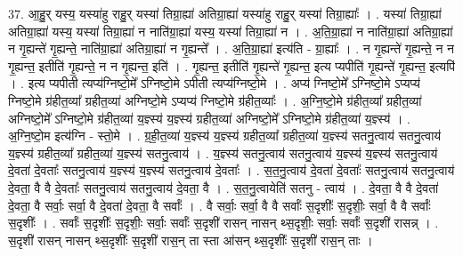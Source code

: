 \documentclass[17pt]{extarticle}
\begin{document}
37. आ॒हु॒र् यस्य॒ यस्या॑हु राहु॒र् यस्या॑ तिग्रा॒ह्या॑ अतिग्रा॒ह्या॑ यस्या॑हु राहु॒र् यस्या॑ तिग्रा॒ह्याः᳚ । . यस्या॑ तिग्रा॒ह्या॑ अतिग्रा॒ह्या॑ यस्य॒ यस्या॑ तिग्रा॒ह्या॑ न नाति॑ग्रा॒ह्या॑ यस्य॒ यस्या॑ तिग्रा॒ह्या॑ न । . अ॒ति॒ग्रा॒ह्या॑ न नाति॑ग्रा॒ह्या॑ अतिग्रा॒ह्या॑ न गृ॒ह्यन्ते॑ गृ॒ह्यन्ते॒ नाति॑ग्रा॒ह्या॑ अतिग्रा॒ह्या॑ न गृ॒ह्यन्ते᳚ । . अ॒ति॒ग्रा॒ह्या॑ इत्य॑ति - ग्रा॒ह्याः᳚ । . न गृ॒ह्यन्ते॑ गृ॒ह्यन्ते॒ न न गृ॒ह्यन्त॒ इतीति॑ गृ॒ह्यन्ते॒ न न गृ॒ह्यन्त॒ इति॑ । . गृ॒ह्यन्त॒ इतीति॑ गृ॒ह्यन्ते॑ गृ॒ह्यन्त॒ इत्य प्यपीति॑ गृ॒ह्यन्ते॑ गृ॒ह्यन्त॒ इत्यपि॑ । . इत्य प्यपीती त्यप्य॑ग्निष्टो॒मे᳚ ऽग्निष्टो॒मे ऽपीती त्यप्य॑ग्निष्टो॒मे । . अप्य॑ ग्निष्टो॒मे᳚ ऽग्निष्टो॒मे ऽप्यप्य॑ ग्निष्टो॒मे ग्र॑हीत॒व्या᳚ ग्रहीत॒व्या॑ अग्निष्टो॒मे ऽप्यप्य॑ ग्निष्टो॒मे ग्र॑हीत॒व्याः᳚ । . अ॒ग्नि॒ष्टो॒मे ग्र॑हीत॒व्या᳚ ग्रहीत॒व्या॑ अग्निष्टो॒मे᳚ ऽग्निष्टो॒मे ग्र॑हीत॒व्या॑ य॒ज्ञ्स्य॑ य॒ज्ञ्स्य॑ ग्रहीत॒व्या॑ अग्निष्टो॒मे᳚ ऽग्निष्टो॒मे ग्र॑हीत॒व्या॑ य॒ज्ञ्स्य॑ । . अ॒ग्नि॒ष्टो॒म इत्य॑ग्नि - स्तो॒मे । . ग्र॒ही॒त॒व्या॑ य॒ज्ञ्स्य॑ य॒ज्ञ्स्य॑ ग्रहीत॒व्या᳚ ग्रहीत॒व्या॑ य॒ज्ञ्स्य॑ सतनु॒त्वाय॑ सतनु॒त्वाय॑ य॒ज्ञ्स्य॑ ग्रहीत॒व्या᳚ ग्रहीत॒व्या॑ य॒ज्ञ्स्य॑ सतनु॒त्वाय॑ । . य॒ज्ञ्स्य॑ सतनु॒त्वाय॑ सतनु॒त्वाय॑ य॒ज्ञ्स्य॑ य॒ज्ञ्स्य॑ सतनु॒त्वाय॑ दे॒वता॑ दे॒वताः᳚ सतनु॒त्वाय॑ य॒ज्ञ्स्य॑ य॒ज्ञ्स्य॑ सतनु॒त्वाय॑ दे॒वताः᳚ । . स॒त॒नु॒त्वाय॑ दे॒वता॑ दे॒वताः᳚ सतनु॒त्वाय॑ सतनु॒त्वाय॑ दे॒वता॒ वै वै दे॒वताः᳚ सतनु॒त्वाय॑ सतनु॒त्वाय॑ दे॒वता॒ वै । . स॒त॒नु॒त्वायेति॑ सतनु - त्वाय॑ । . दे॒वता॒ वै वै दे॒वता॑ दे॒वता॒ वै सर्वाः॒ सर्वा॒ वै दे॒वता॑ दे॒वता॒ वै सर्वाः᳚ । . वै सर्वाः॒ सर्वा॒ वै वै सर्वाः᳚ स॒दृशीः᳚ स॒दृशीः॒ सर्वा॒ वै वै सर्वाः᳚ स॒दृशीः᳚ । . सर्वाः᳚ स॒दृशीः᳚ स॒दृशीः॒ सर्वाः॒ सर्वाः᳚ स॒दृशी॑ रासन् नासन् थ्स॒दृशीः॒ सर्वाः॒ सर्वाः᳚ स॒दृशी॑ रासन्न् । . स॒दृशी॑ रासन् नासन् थ्स॒दृशीः᳚ स॒दृशी॑ रास॒न् ता स्ता आ॑सन् थ्स॒दृशीः᳚ स॒दृशी॑ रास॒न् ताः । \newline
\end{document}
